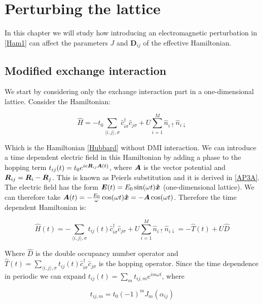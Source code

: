 \chapter{Perturbing the lattice}

In this chapter we will study how introducing an electromagnetic perturbation in \ref{Ham1} can affect the parameters $J$ and $\boldsymbol{D}_{ij}$ of the effective Hamiltonian. 

\section{Modified exchange interaction}

We start by considering only the exchange interaction part in a one-dimensional lattice. Consider the Hamiltonian:

\begin{equation}
\hat{H} = -t_0\sum_{\langle i,j \rangle, \sigma} \hat{c}_{i \sigma}^\dagger \hat{c}_{j \sigma} + U \sum_{i=1}^M \hat{n}_{i\uparrow}\hat{n}_{i\downarrow}
\end{equation}

Which is the Hamiltonian \ref{Hubbard} without DMI interaction. We can introduce a time dependent electric field in this Hamiltonian by adding a phase to the hopping term $t_{ij}(t) = t_0e^{ie\boldsymbol{R}_{ij}\boldsymbol{A}(t)}$, where $\boldsymbol{A}$ is the vector potential and $\boldsymbol{R}_{ij} = \boldsymbol{R}_i-\boldsymbol{R}_j$. This is known as Peierls substitution and it is derived in \ref{AP3A}. The electric field has the form $\boldsymbol{E}(t) = E_0 \sin (\omega t)\boldsymbol{\hat{x}}$ (one-dimensional lattice). We can therefore take $\boldsymbol{A}(t) = -\frac{E_0}{\omega}\cos(\omega t)\boldsymbol{\hat{x}} = -\boldsymbol{A}\cos(\omega t)$. Therefore the time dependent Hamiltonian is:

\begin{equation}
\hat{H}(t) = -\sum_{\langle i,j \rangle, \sigma} t_{ij}(t)\hat{c}_{i \sigma}^\dagger \hat{c}_{j \sigma} + U \sum_{i=1}^M \hat{n}_{i\uparrow}\hat{n}_{i\downarrow} = -\hat{T}(t) + U\hat{D}
\end{equation}

Where $\hat{D}$ is the double occupancy number operator and $\hat{T}(t) = \sum_{\langle i,j \rangle, \sigma} t_{ij}(t)\hat{c}_{i \sigma}^\dagger \hat{c}_{j \sigma}$ is the hopping operator. Since the time dependence in periodic we can expand $t_{ij}(t) = \sum_m t_{ij,m} e^{im \omega t}$, where

\begin{equation}
t_{ij,m} = t_0(-1)^mJ_m(\alpha_{ij})
\end{equation}

